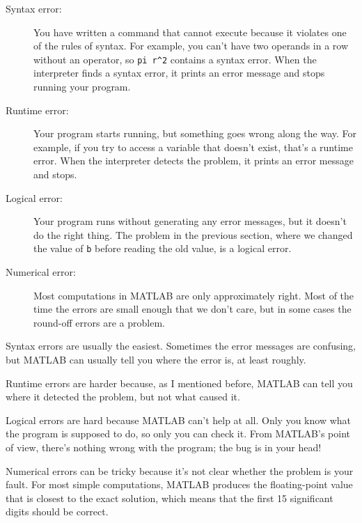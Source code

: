 \documentclass[
]{book}
\numberwithin{Answer}{chapter}
\numberwithin{Exercise}{chapter}
\begin{document}
\begin{description}

\item[Syntax error:] You have written a command that cannot
execute because it violates one of the rules of syntax.  For example,
you can't have two operands in a row without an operator, so
\verb+pi r^2+ contains a syntax error.  When the interpreter finds a syntax
error, it prints an error message and stops running your program.

\item[Runtime error:] Your program starts running, but something goes
wrong along the way.  For example, if you try to access a variable
that doesn't exist, that's a runtime error.  When the interpreter detects the
problem, it prints an error message and stops.

\item[Logical error:] Your program runs without generating any error
messages, but it doesn't do the right thing.  The problem in the
previous section, where we changed the value of {\tt b} before
reading the old value, is a logical error.

\item[Numerical error:] Most computations in MATLAB are only
approximately right.  Most of the time the errors are small enough
that we don't care, but in some cases the round-off errors are a problem.

\end{description}

Syntax errors are usually the easiest.  Sometimes the error messages
are confusing, but MATLAB can usually tell you where the error is, at
least roughly.

Runtime errors are harder because, as I mentioned before, MATLAB
can tell you where it detected the problem, but not what caused it.

Logical errors are hard because MATLAB can't help at all.  Only you
know what the program is supposed to do, so only you can check it.
From MATLAB's point of view, there's nothing wrong with the program;
the bug is in your head!


Numerical errors can be tricky because it's not clear whether the
problem is your fault.  For most simple computations, MATLAB produces
the floating-point value that is closest to the exact solution, which
means that the first 15 significant digits should be correct.  
\end{document}
